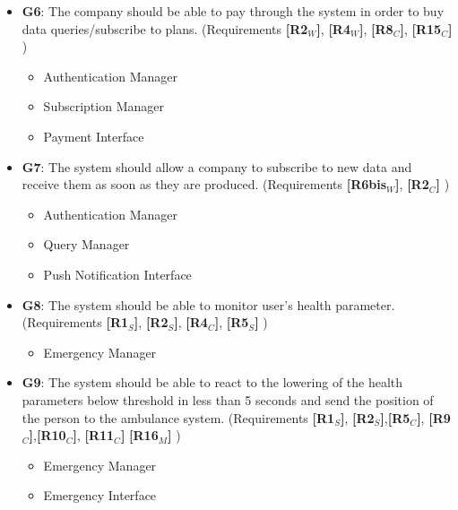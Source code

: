 \begin{itemize}
    
    \item \textbf{G6}: The company should be able to pay through the system in order to buy data queries/subscribe to plans. \newline(Requirements \textbf{[R2$_W$]}, \textbf{[R4$_W$]},  \textbf{[R8$_C$]}, \textbf{[R15$_C$]} )
    \begin{itemize}
        \item Authentication Manager
        \item Subscription Manager
        \item Payment Interface
    \end{itemize}   
   
   
   
    \item \textbf{G7}: The system should allow a company to subscribe to new data and receive them as soon as they are produced. \newline(Requirements \textbf{[R6bis$_W$]}, \textbf{[R2$_C$]} )
    \begin{itemize}
        \item Authentication Manager
        \item Query Manager
        \item Push Notification Interface
    \end{itemize}   
   
   
   
   
    \item \textbf{G8}: The system should be able to monitor user's health parameter. \newline(Requirements \textbf{[R1$_S$]}, \textbf{[R2$_S$]}, \textbf{[R4$_C$]}, \textbf{[R5$_S$]} )
    \begin{itemize}
        \item Emergency Manager
    \end{itemize}
   
   
   
    \item \textbf{G9}: The system should be able to react to the lowering of the health parameters below threshold in less than 5 seconds and send the position of the person to the ambulance system. \newline(Requirements \textbf{[R1$_S$]}, \textbf{[R2$_S$]},\textbf{[R5$_C$]}, \textbf{[R9$_C$]},\textbf{[R10$_C$]}, \textbf{[R11$_C$]} \textbf{[R16$_M$]} )
    \begin{itemize}
        \item Emergency Manager
        \item Emergency Interface
    \end{itemize}    
    

\end{itemize}
